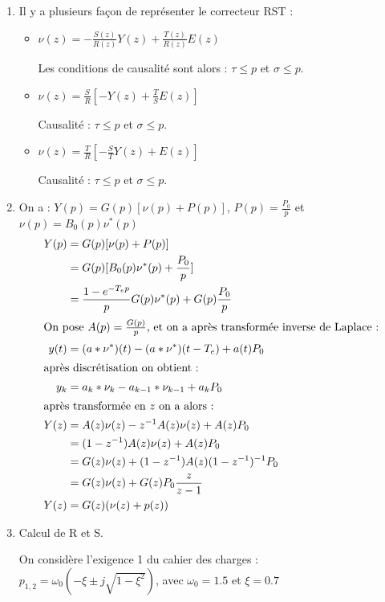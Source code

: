 \documentclass[../main.tex]{subfiles}
\begin{document}
\begin{enumerate}

\item Il y a plusieurs façon de représenter le correcteur RST :
\begin{itemize}
\item $\nu(z)=-\frac{S(z)}{R(z)}Y(z) + \frac{T(z)}{R(z)}E(z)$

Les conditions de causalité sont alors : $\tau \leq p$ et $\sigma \leq p$.\\

\item $\nu(z)=\frac{S}{R}[-Y(z) + \frac{T}{S}E(z)] $

Causalité : $\tau \leq p$ et $\sigma \leq p$.\\

\item $\nu(z)=\frac{T}{R}[-\frac{S}{T}Y(z) + E(z)]$

Causalité : $\tau \leq p$ et $\sigma \leq p$.\\
\end{itemize}


\item On a : $Y(p)= G(p)[\nu(p) + P(p)]$, $P(p) = \frac{P_0}{p}$ et $\nu(p) = B_0(p)\nu^*(p)$\\

\begin{align*}
Y(p) &=  G(p)[\nu(p) + P(p)]\\
&= G(p)[B_0(p)\nu^*(p)+\frac{P_0}{p}]\\
&= \frac{1-e^{-T_ep}}{p}G(p)\nu^*(p) + G(p)\frac{P_0}{p}\\
\intertext{On pose $A(p) = \frac{G(p)}{p}$, et on a après transformée inverse de Laplace :}
y(t) &= (a*\nu^*)(t)-(a*\nu^*)(t-T_e)+a(t)P_0\\
\intertext{après discrétisation on obtient : }
y_k & = a_k*\nu_k-a_{k-1}*\nu_{k-1} + a_kP_0\\
\intertext{après transformée en $z$ on a alors :}
Y(z) &= A(z)\nu(z)-z^{-1}A(z)\nu(z)+A(z)P_0\\
&=(1-z^{-1})A(z)\nu(z)+A(z)P_0\\
&= G(z)\nu(z)+(1-z^{-1})A(z)(1-z^{-1})^{-1}P_0\\
&= G(z)\nu(z)+G(z)P_0\frac{z}{z-1}\\
Y(z)&= G(z)(\nu(z)+p(z))
\end{align*}
\bigbreak

\item Calcul de R et S.

On considère l'exigence 1 du cahier des charges :\\
$p_{1,2}=\omega_0 (-\xi \pm j\sqrt{1-\xi^2})$, avec $\omega_0 = 1.5$ et $\xi=0.7$


\end{enumerate}
\end{document}

